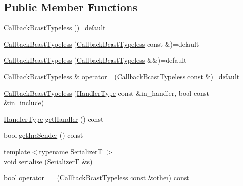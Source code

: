 \subsection*{Public Member Functions}
\begin{DoxyCompactItemize}
\item 
\hyperlink{structvt_1_1pipe_1_1callback_1_1_callback_bcast_typeless_a4f41ee712c6d8359f2702731cdb508e0}{Callback\+Bcast\+Typeless} ()=default
\item 
\hyperlink{structvt_1_1pipe_1_1callback_1_1_callback_bcast_typeless_a21bda4efe28c82f442bf0881b1148196}{Callback\+Bcast\+Typeless} (\hyperlink{structvt_1_1pipe_1_1callback_1_1_callback_bcast_typeless}{Callback\+Bcast\+Typeless} const \&)=default
\item 
\hyperlink{structvt_1_1pipe_1_1callback_1_1_callback_bcast_typeless_a47d8224353671c6a7769abaed3a032ed}{Callback\+Bcast\+Typeless} (\hyperlink{structvt_1_1pipe_1_1callback_1_1_callback_bcast_typeless}{Callback\+Bcast\+Typeless} \&\&)=default
\item 
\hyperlink{structvt_1_1pipe_1_1callback_1_1_callback_bcast_typeless}{Callback\+Bcast\+Typeless} \& \hyperlink{structvt_1_1pipe_1_1callback_1_1_callback_bcast_typeless_acad87bb1887561979d41c298896463e3}{operator=} (\hyperlink{structvt_1_1pipe_1_1callback_1_1_callback_bcast_typeless}{Callback\+Bcast\+Typeless} const \&)=default
\item 
\hyperlink{structvt_1_1pipe_1_1callback_1_1_callback_bcast_typeless_a2303983c8ae3dacbb2f1ade336a1c1e8}{Callback\+Bcast\+Typeless} (\hyperlink{namespacevt_af64846b57dfcaf104da3ef6967917573}{Handler\+Type} const \&in\+\_\+handler, bool const \&in\+\_\+include)
\item 
\hyperlink{namespacevt_af64846b57dfcaf104da3ef6967917573}{Handler\+Type} \hyperlink{structvt_1_1pipe_1_1callback_1_1_callback_bcast_typeless_a15f773a711d9771b8c60683de2762bc8}{get\+Handler} () const
\item 
bool \hyperlink{structvt_1_1pipe_1_1callback_1_1_callback_bcast_typeless_a3a93cb6e0ac25c14edfece0d19feff23}{get\+Inc\+Sender} () const
\item 
{\footnotesize template$<$typename SerializerT $>$ }\\void \hyperlink{structvt_1_1pipe_1_1callback_1_1_callback_bcast_typeless_ad8a8822a82d979df798f8dcb57c8c4e6}{serialize} (SerializerT \&s)
\item 
bool \hyperlink{structvt_1_1pipe_1_1callback_1_1_callback_bcast_typeless_a38b71fafbb0f2e6ce000eaa5faec463c}{operator==} (\hyperlink{structvt_1_1pipe_1_1callback_1_1_callback_bcast_typeless}{Callback\+Bcast\+Typeless} const \&other) const

\end{DoxyCompactItemize}
